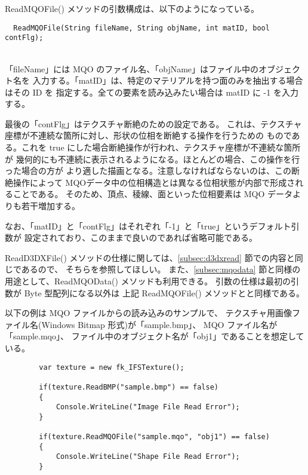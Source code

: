 ReadMQOFile() メソッドの引数構成は、以下のようになっている。
\\
\begin{screen}
\begin{verbatim}
  ReadMQOFile(String fileName, String objName, int matID, bool contFlg);
\end{verbatim}
\end{screen}
~ \\
「fileName」には MQO のファイル名、「objName」はファイル中のオブジェクト名を
入力する。「matID」は、特定のマテリアルを持つ面のみを抽出する場合はその ID を
指定する。全ての要素を読み込みたい場合は matID に -1 を入力する。

最後の「contFlg」はテクスチャ断絶のための設定である。
これは、テクスチャ座標が不連続な箇所に対し、形状の位相を断絶する操作を行うための
ものである。これを true にした場合断絶操作が行われ、テクスチャ座標が不連続な箇所が
幾何的にも不連続に表示されるようになる。ほとんどの場合、この操作を行った場合の方が
より適した描画となる。注意しなければならないのは、この断絶操作によって
MQOデータ中の位相構造とは異なる位相状態が内部で形成されることである。
そのため、頂点、稜線、面といった位相要素は MQO データよりも若干増加する。

なお、「matID」と「contFlg」はそれぞれ「-1」と「true」というデフォルト引数が
設定されており、このままで良いのであれば省略可能である。

ReadD3DXFile() メソッドの仕様に関しては、\ref{subsec:d3dxread} 節での内容と同じであるので、
そちらを参照してほしい。
また、\ref{subsec:mqodata} 節と同様の用途として、ReadMQOData() メソッドも利用できる。
引数の仕様は最初の引数が Byte 型配列になる以外は
上記 ReadMQOFile() メソッドとと同様である。

以下の例は MQO ファイルからの読み込みのサンプルで、
テクスチャ用画像ファイル名(Windows Bitmap 形式)が「sample.bmp」、
MQO ファイル名が「sample.mqo」、
ファイル中のオブジェクト名が「obj1」であることを想定している。
\\
\begin{breakbox}
\begin{verbatim}
        var texture = new fk_IFSTexture();

        if(texture.ReadBMP("sample.bmp") == false)
        {
            Console.WriteLine("Image File Read Error");
        }

        if(texture.ReadMQOFile("sample.mqo", "obj1") == false)
        {
            Console.WriteLine("Shape File Read Error");
        }
\end{verbatim}
\end{breakbox} ~

